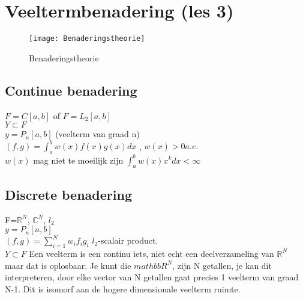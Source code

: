 \chapter{Veeltermbenadering (les 3)}
\begin{figure}[h]
	\centering
	\texttt{[image: Benaderingstheorie]}
	\caption{Benaderingstheorie}
\end{figure}
\section{Continue benadering}
$F=C[a,b]$ of $F=L_2[a,b]$ \\
$Y \subset F$ \\
$y=P_n[a,b]$ (veelterm van graad n)\\
$(f,g)=\int_a^b w(x)f(x)g(x)dx$ , $w(x) >0 a.e.$ \\
$w(x)$ mag niet te moeilijk zijn $\int_a^b w(x) x^k dx < \infty$ 
\section{Discrete benadering}
F=$\mathbb{R}^N$, $\mathbb{C}^N$, $l_2$ \\
$y= P_n[a,b]$ \\
$(f,g)=\sum_{i=1}^N w_i f_i g_i$ $l_2$-scalair product. \\
$Y \subset F$ Een veelterm is een continu iets, niet echt een deelverzameling van $\mathbb{R}^N$ maar dat is oplosbaar. Je kunt die $mathbb{R}^N$, zijn N getallen, je kan dit interpreteren, door elke vector van N getallen gaat precies 1 veelterm van graad N-1. Dit is isomorf aan de hogere dimensionale veelterm ruimte. \\

